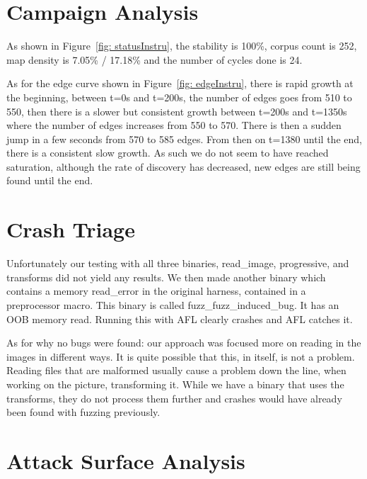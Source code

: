 \documentclass[letterpaper,twocolumn,10pt]{article}
\begin{document}

\section{Campaign Analysis}

As shown in Figure~\ref{fig: statusInstru}, the stability is 100\%, corpus count is 252, map density is 7.05\% / 17.18\% and the number of cycles done is 24.

As for the edge curve shown in Figure~\ref{fig: edgeInstru}, there is rapid growth at the beginning, between t=0s and t=200s, the number of edges goes from 510 to 550, then there is a slower but consistent growth between t=200s and t=1350s where the number of edges increases from 550 to 570. There is then a sudden jump in a few seconds from 570 to 585 edges. From then on t=1380 until the end, there is a consistent slow growth. As such we do not seem to have reached saturation, although the rate of discovery has decreased, new edges are still being found until the end.


\section{Crash Triage}

Unfortunately our testing with all three binaries, read\_image, progressive, and transforms did not yield any results. We then made another binary which contains a memory read\_error in the original harness, contained in a preprocessor macro. This binary is called fuzz\_fuzz\_induced\_bug. It has an OOB memory read. Running this with AFL clearly crashes and AFL catches it.

As for why no bugs were found: our approach was focused more on reading in the images in different ways. It is quite possible that this, in itself, is not a problem. Reading files that are malformed usually cause a problem down the line, when working on the picture, transforming it. While we have a binary that uses the transforms, they do not process them further and crashes would have already been found with fuzzing previously.

\section{Attack Surface Analysis}
\end{document}

